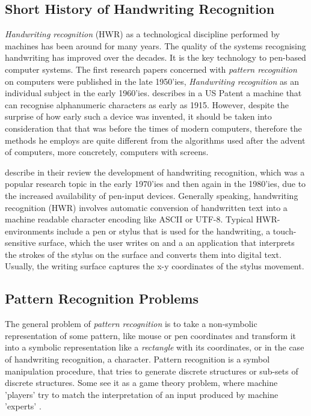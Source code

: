 \subsection{Short History of Handwriting Recognition}
\label{sec:shorthistoryofhwr}

\emph{Handwriting recognition} (HWR) as a technological discipline performed 
by machines has been around for many years. The quality of the systems 
recognising handwriting has improved over the decades. It is the key 
technology to pen-based computer systems. The first research papers 
concerned with \emph{pattern recognition} on computers were published 
in the late 1950'ies, \emph{Handwriting recognition} as an individual subject in 
the early 1960'ies.  describes in a US Patent
a machine that can recognise alphanumeric characters as early as 1915. 
However, despite the surprise of how early such a device was invented,
it should be taken into consideration that that was before the times 
of modern computers, therefore the methods he employs are quite different 
from the algorithms used after the advent of computers, more concretely, 
computers with screens. 

 describe in their review the development of 
handwriting recognition, which was a popular research topic in the early 
1970'ies and then again in the 1980'ies, due to the increased availability 
of pen-input devices.  Generally speaking, handwriting recognition (HWR) 
involves automatic conversion of handwritten text into a machine readable 
character encoding like ASCII or UTF-8. Typical HWR-environments include 
a pen or stylus that is used for the handwriting, a touch-sensitive surface, 
which the user writes on and a an application that interprets the strokes 
of the stylus on the surface and converts them into digital text. 
Usually, the writing surface captures the x-y coordinates of the stylus 
movement.

\subsection{Pattern Recognition Problems}
\label{sec:patternrecognitionproblems}


The general problem of \emph{pattern recognition} is to take a non-symbolic 
representation of some pattern, like mouse or pen coordinates and transform
it into a symbolic representation like a \emph{rectangle} with its coordinates,
or in the case of handwriting recognition, a character. Pattern recognition is 
a symbol manipulation procedure, that tries to generate discrete structures or sub-sets of discrete structures. Some see it as a game theory problem, 
where machine 'players' try to match the interpretation of an input produced 
by machine 'experts' .

